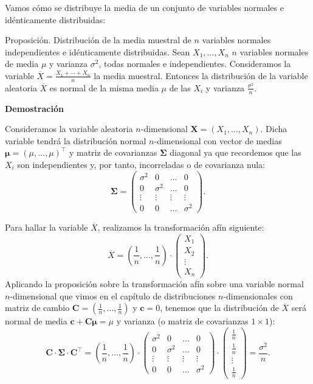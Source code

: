 \documentclass[
  letterpaper,
  DIV=11,
  numbers=noendperiod]{scrreprt}
\begin{document}
Vamos cómo se distribuye la media de un conjunto de variables normales e
idénticamente distribuidas:

Proposición. Distribución de la media muestral de \(n\) variables
normales independientes e idénticamente distribuidas. Sean
\(X_1,\ldots, X_n\) \(n\) variables normales de media \(\mu\) y varianza
\(\sigma^2\), todas normales e independientes. Consideramos la variable
\(\overline{X}=\frac{X_1+\cdots + X_n}{n}\) la media muestral. Entonces
la distribución de la variable aleatoria \(\overline{X}\) es normal de
la misma media \(\mu\) de las \(X_i\) y varianza \(\frac{\sigma^2}{n}\).

\textbf{Demostración}

Consideramos la variable aleatoria \(n\)-dimensional
\(\mathbf{X}=(X_1,\ldots,X_n)\). Dicha variable tendrá la distribución
normal \(n\)-dimensional con vector de medias
\(\mathbf{\mu}=(\mu,\ldots,\mu)^\top\) y matriz de covarianzas
\(\mathbf{\Sigma}\) diagonal ya que recordemos que las \(X_i\) son
independientes y, por tanto, incorreladas o de covarianza nula: \[
\mathbf{\Sigma}=\begin{pmatrix}
\sigma^2 & 0 & \ldots & 0 \\
0 & \sigma^2 & \ldots & 0 \\
\vdots & \vdots & \vdots & \vdots \\
0 & 0 & \ldots & \sigma^2
\end{pmatrix}.
\]

Para hallar la variable \(\overline{X}\), realizamos la transformación
afín siguiente: \[
\overline{X}=\left(\frac{1}{n},\ldots,\frac{1}{n}\right)\cdot\begin{pmatrix} X_1 \\ X_2\\\vdots \\ X_n \end{pmatrix}.
\] Aplicando la proposición sobre la transformación afín sobre una
variable normal \(n\)-dimensional que vimos en el capítulo de
distribuciones \(n\)-dimensionales con matriz de cambio
\(\mathbf{C}=\left(\frac{1}{n},\ldots,\frac{1}{n}\right)\) y
\(\mathbf{c}=0\), tenemos que la distribución de \(\overline{X}\) será
normal de media \(\mathbf{c}+\mathbf{C}\mathbf{\mu} = \mu\) y varianza
(o matriz de covarianzas \(1\times 1\)): \[
\mathbf{C}\cdot\mathbf{\Sigma}\cdot\mathbf{C}^\top =\left(\frac{1}{n},\ldots,\frac{1}{n}\right)\cdot\begin{pmatrix}
\sigma^2 & 0 & \ldots & 0 \\
0 & \sigma^2 & \ldots & 0 \\
\vdots & \vdots & \vdots & \vdots \\
0 & 0 & \ldots & \sigma^2
\end{pmatrix}\cdot \begin{pmatrix}\frac{1}{n}\\\frac{1}{n}\\\vdots\\\frac{1}{n}\end{pmatrix} =\frac{\sigma^2}{n}.
\]
\end{document}

